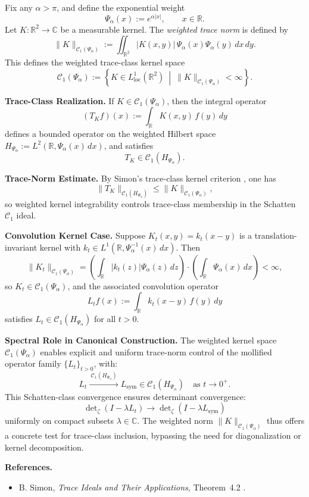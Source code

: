 \begin{definition}\label{def:weighted_trace_norm_space}
Fix any \( \alpha > \pi \), and define the exponential weight
\[
\Psi_\alpha(x) := e^{\alpha |x|}, \qquad x \in \mathbb{R}.
\]
Let \( K \colon \mathbb{R}^2 \to \mathbb{C} \) be a measurable kernel. The \emph{weighted trace norm} is defined by
\[
\| K \|_{\mathcal{C}_1(\Psi_\alpha)} := \iint_{\mathbb{R}^2} |K(x,y)| \, \Psi_\alpha(x) \Psi_\alpha(y)\, dx\,dy.
\]
This defines the weighted trace-class kernel space
\[
\mathcal{C}_1(\Psi_\alpha) := \left\{ K \in L^1_{\mathrm{loc}}(\mathbb{R}^2) \ \middle|\ \| K \|_{\mathcal{C}_1(\Psi_\alpha)} < \infty \right\}.
\]

\medskip
\noindent\textbf{Trace-Class Realization.}
If \( K \in \mathcal{C}_1(\Psi_\alpha) \), then the integral operator
\[
(T_K f)(x) := \int_{\mathbb{R}} K(x,y)\, f(y)\, dy
\]
defines a bounded operator on the weighted Hilbert space \( H_{\Psi_\alpha} := L^2(\mathbb{R}, \Psi_\alpha(x)\, dx) \), and satisfies
\[
T_K \in \mathcal{C}_1(H_{\Psi_\alpha}).
\]

\medskip
\noindent\textbf{Trace-Norm Estimate.}
By Simon’s trace-class kernel criterion \cite[Thm.~4.2]{Simon2005TraceIdeals}, one has
\[
\|T_K\|_{\mathcal{C}_1(H_{\Psi_\alpha})} \le \|K\|_{\mathcal{C}_1(\Psi_\alpha)},
\]
so weighted kernel integrability controls trace-class membership in the Schatten \(\mathcal{C}_1\) ideal.

\medskip
\noindent\textbf{Convolution Kernel Case.}
Suppose \( K_t(x,y) = k_t(x - y) \) is a translation-invariant kernel with \( k_t \in L^1(\mathbb{R}, \Psi_\alpha^{-1}(x)\, dx) \). Then
\[
\| K_t \|_{\mathcal{C}_1(\Psi_\alpha)} = \left( \int_{\mathbb{R}} |k_t(z)| \Psi_\alpha(z)\, dz \right) \cdot \left( \int_{\mathbb{R}} \Psi_\alpha(x)\, dx \right) < \infty,
\]
so \( K_t \in \mathcal{C}_1(\Psi_\alpha) \), and the associated convolution operator
\[
L_t f(x) := \int_{\mathbb{R}} k_t(x - y)\, f(y)\, dy
\]
satisfies \( L_t \in \mathcal{C}_1(H_{\Psi_\alpha}) \) for all \( t > 0 \).

\medskip
\noindent\textbf{Spectral Role in Canonical Construction.}
The weighted kernel space \( \mathcal{C}_1(\Psi_\alpha) \) enables explicit and uniform trace-norm control of the mollified operator family \( \{L_t\}_{t > 0} \), with:
\[
L_t \xrightarrow{\ \mathcal{C}_1(H_{\Psi_\alpha})\ } L_{\mathrm{sym}} \in \mathcal{C}_1(H_{\Psi_\alpha}) \quad \text{as } t \to 0^+.
\]
This Schatten-class convergence ensures determinant convergence:
\[
\det\nolimits_\zeta(I - \lambda L_t) \to \det\nolimits_\zeta(I - \lambda L_{\mathrm{sym}})
\]
uniformly on compact subsets \( \lambda \in \mathbb{C} \). The weighted norm \( \|K\|_{\mathcal{C}_1(\Psi_\alpha)} \) thus offers a concrete test for trace-class inclusion, bypassing the need for diagonalization or kernel decomposition.

\medskip
\noindent\textbf{References.}
\begin{itemize}
    \item B. Simon, \emph{Trace Ideals and Their Applications}, Theorem~4.2 \cite{Simon2005TraceIdeals}.
\end{itemize}
\end{definition}

